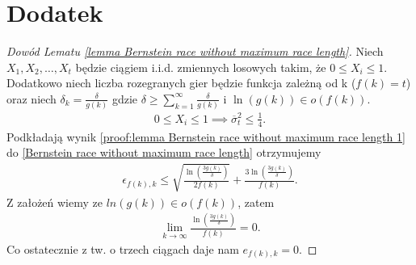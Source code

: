 \documentclass[inzynierska]{pwr_wmat_praca_dyplomowa}
\theoremstyle{plain}
\numberwithin{theorem}{chapter}
\theoremstyle{definition}
\numberwithin{theorem}{chapter}
\begin{document}
{\backmatter \chapter{Dodatek}} \label{Dodatek}
\begin{proof}[Dowód Lematu \ref{lemma Bernstein race without maximum race length}]
	\label{proof:lemma Bernstein race without maximum race length}Niech $X_1, X_2, \dots, X_t$ będzie ciągiem i.i.d. zmiennych losowych takim, że  $0 \le X_i \le 1$. Dodatkowo niech liczba rozegranych gier będzie funkcja zależną od k ($f(k) = t$) oraz niech $\delta_k = \frac{\delta}{g(k)}$
	gdzie $\delta \ge \sum_{k=1}^{\infty} \frac{\delta}{g(k)}$ i $\ln(g(k)) \in o(f(k))$.
	\begin{gather}
		\label{proof:lemma Bernstein race without maximum race length 1}
		0\le X_i \le 1 \implies \overline{\sigma}_t^2 \le \frac{1}{4}.
	\end{gather}
	Podkładają wynik \eqref{proof:lemma Bernstein race without maximum race length 1} do \eqref{Bernstein race without maximum race length} otrzymujemy 
	\begin{gather*}
		\epsilon_{f(k), k} \le  \sqrt{\frac{\ln(\frac{3g(k)}{\delta})}{2f(k)}} + \frac{3  \ln{(\frac{3g(k)}{\delta})}}{f(k)}.
	\end{gather*}
	Z założeń wiemy ze $ln(g(k)) \in o(f(k))$, zatem
	\begin{gather*}
		\lim\limits_{k\to\infty} \frac{  \ln{(\frac{3g(k)}{\delta})}}{f(k)} = 0.
	\end{gather*}
	Co ostatecznie z tw. o trzech ciągach daje nam $e_{f(k), k} = 0$.
\end{proof}
\end{document}

